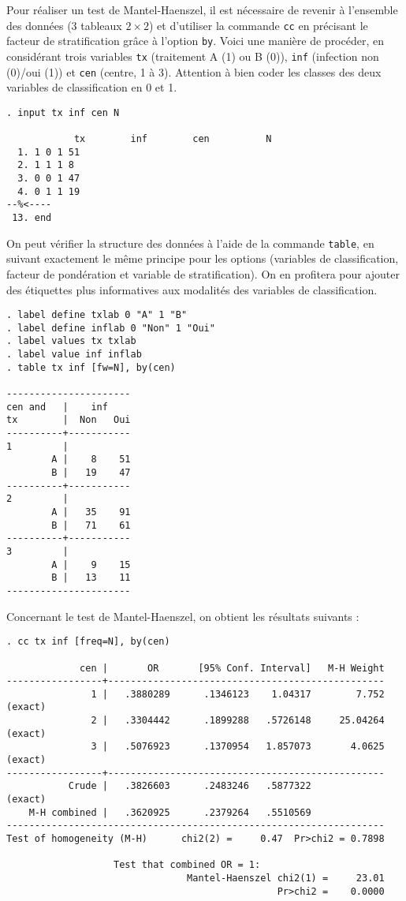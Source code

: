 Pour réaliser un test de Mantel-Haenszel, il est nécessaire de revenir à
l'ensemble des données (3 tableaux $2\times 2$) et d'utiliser la commande
\texttt{cc} en précisant le facteur de stratification grâce à l'option
\texttt{by}. Voici une manière de procéder, en considérant trois variables
\texttt{tx} (traitement A (1) ou B (0)), \texttt{inf} (infection non (0)/oui (1)) et
\texttt{cen} (centre, 1 à 3). Attention à bien coder les classes des deux
variables de classification en 0 et 1.
\begin{verbatim}
. input tx inf cen N

            tx        inf        cen          N
  1. 1 0 1 51
  2. 1 1 1 8
  3. 0 0 1 47
  4. 0 1 1 19
--%<----
 13. end
\end{verbatim}
On peut vérifier la structure des données à l'aide de la commande
\texttt{table}, en suivant exactement le même principe pour les options
(variables de classification, facteur de pondération et variable de
stratification). On en profitera pour ajouter des étiquettes plus
informatives aux modalités des variables de classification.
\begin{verbatim}
. label define txlab 0 "A" 1 "B"
. label define inflab 0 "Non" 1 "Oui"
. label values tx txlab
. label value inf inflab
. table tx inf [fw=N], by(cen)

----------------------
cen and   |    inf    
tx        |  Non   Oui
----------+-----------
1         |
        A |    8    51
        B |   19    47
----------+-----------
2         |
        A |   35    91
        B |   71    61
----------+-----------
3         |
        A |    9    15
        B |   13    11
----------------------
\end{verbatim}
Concernant le test de Mantel-Haenszel, on obtient les résultats suivants :
\begin{verbatim}
. cc tx inf [freq=N], by(cen)

             cen |       OR       [95% Conf. Interval]   M-H Weight
-----------------+-------------------------------------------------
               1 |   .3880289      .1346123    1.04317        7.752 (exact)
               2 |   .3304442      .1899288   .5726148     25.04264 (exact)
               3 |   .5076923      .1370954   1.857073       4.0625 (exact)
-----------------+-------------------------------------------------
           Crude |   .3826603      .2483246   .5877322              (exact)
    M-H combined |   .3620925      .2379264   .5510569              
-------------------------------------------------------------------
Test of homogeneity (M-H)      chi2(2) =     0.47  Pr>chi2 = 0.7898

                   Test that combined OR = 1:
                                Mantel-Haenszel chi2(1) =     23.01
                                                Pr>chi2 =    0.0000
\end{verbatim}
